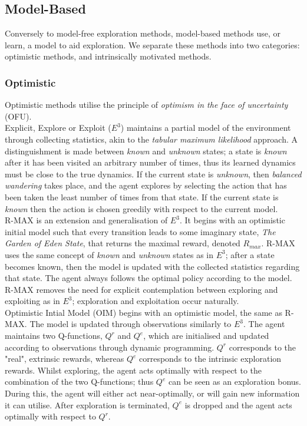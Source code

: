 \subsection{Model-Based}
Conversely to model-free exploration methods, model-based methods use, or learn, a model to aid exploration. We separate these methods into two categories: optimistic methods, and intrinsically motivated methods.
\subsubsection{Optimistic}
Optimistic methods utilise the principle of \textit{optimism in the face of uncertainty} (OFU).
\\ Explicit, Explore or Exploit ($E^3$)  \cite{Kearns+Singh:2002} maintains a partial model of the environment through collecting statistics, akin to the \textit{tabular maximum likelihood} approach. A distinguishment is made between \textit{known} and \textit{unknown} states; a state is \textit{known} after it has been visited an arbitrary number of times, thus its learned dynamics must be close to the true dynamics. If the current state is \textit{unknown}, then \textit{balanced wandering} takes place, and the agent explores by selecting the action that has been taken the least number of times from that state. If the current state is \textit{known} then the action is chosen greedily with respect to the current model.
\\ R-MAX \cite{10.1162/153244303765208377} is an extension and generalisation of $E^3$. It begins with an optimistic initial model such that every transition leads to some imaginary state, \textit{The Garden of Eden State}, that returns the maximal reward, denoted $R_{max}$. R-MAX uses the same concept of \textit{known} and \textit{unknown} states as in $E^3$; after a state becomes known, then the model is updated with the collected statistics regarding that state. The agent always follows the optimal policy according to the model. R-MAX removes the need for explicit contemplation between exploring and exploiting as in $E^3$; exploration and exploitation occur naturally.
\\ Optimistic Intial Model (OIM) \cite{10.1145/1390156.1390288} begins with an optimistic model, the same as R-MAX. The model is updated through observations similarly to $E^3$. The agent maintains two Q-functions, $Q^r$ and $Q^e$, which are initialised and updated according to observations through dynamic programming. $Q^r$ corresponds to the "real", extrinsic rewards, whereas $Q^e$ corresponds to the intrinsic exploration rewards. Whilst exploring, the agent acts optimally with respect to the combination of the two Q-functions; thus $Q^e$ can be seen as an exploration bonus. During this, the agent will either act near-optimally, or will gain new information it can utilise. After exploration is terminated, $Q^e$ is dropped and the agent acts optimally with respect to $Q^r$.
